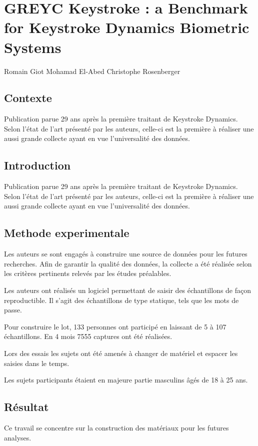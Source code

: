 \section{GREYC Keystroke : a Benchmark for Keystroke Dynamics Biometric Systems\cite{giotGREYC}}
Romain Giot
Mohamad El-Abed
Christophe Rosenberger

\subsection{Contexte}
Publication parue 29 ans après la première traitant de Keystroke Dynamics. Selon l'état de l'art présenté par les auteurs, celle-ci est la première à réaliser une aussi grande collecte ayant en vue l'universalité des données.

\subsection{Introduction}
Publication parue 29 ans après la première traitant de Keystroke Dynamics. Selon l'état de l'art présenté par les auteurs, celle-ci est la première à réaliser une aussi grande collecte ayant en vue l'universalité des données.

\subsection{Methode experimentale}
Les auteurs se sont engagés à construire une source de données pour les futures recherches. Afin de garantir la qualité des données, la collecte a été réalisée selon les critères pertinents relevés par les études préalables.

Les auteurs ont réalisés un logiciel permettant de saisir des échantillons de façon reproductible. Il s'agit des échantillons de type statique, tels que les mots de passe.

Pour construire le lot, 133 personnes ont participé en laissant de 5 à 107 échantillons. En 4 mois 7555 captures ont été réalisées.

Lors des essais les sujets ont été amenés à changer de matériel et espacer les saisies dans le temps.

Les sujets participants étaient en majeure partie masculins âgés de 18 à 25 ans.

\subsection{Résultat}
Ce travail se concentre sur la construction des matériaux pour les futures analyses.

